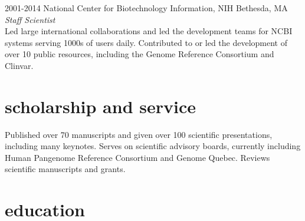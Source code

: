 \documentclass[]{dmc-cv} %
\begin{document}
\begin{entrylist}
    \entry
    {2001-2014}
    {National Center for Biotechnology Information, NIH}
    {Bethesda, MA}
    {\emph{Staff Scientist} \\
    Led large international collaborations and led the development teams for NCBI systems serving 1000s of users daily.
    Contributed to or led the development of over 10 public resources, including the Genome Reference Consortium and Clinvar.
    }
    
    \end{entrylist}


\section{scholarship and service}
Published over 70 manuscripts and given over 100 scientific presentations, including many keynotes. Serves on scientific advisory boards, currently including Human Pangenome Reference Consortium and Genome Quebec. Reviews scientific manuscripts and grants. \\


\section{education}
\end{document}
